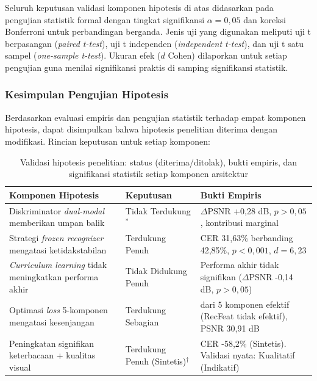 \documentclass[12pt,a4paper]{article}
\begin{document}
Seluruh keputusan validasi komponen hipotesis di atas didasarkan pada pengujian statistik formal dengan tingkat signifikansi $\alpha = 0,05$ dan koreksi Bonferroni untuk perbandingan berganda. Jenis uji yang digunakan meliputi uji t berpasangan (\textit{paired t-test}), uji t independen (\textit{independent t-test}), dan uji t satu sampel (\textit{one-sample t-test}). Ukuran efek ($d$ Cohen) dilaporkan untuk setiap pengujian guna menilai signifikansi praktis di samping signifikansi statistik.


\subsubsection{Kesimpulan Pengujian Hipotesis}
\label{subsubsec:kesimpulan-hipotesis}

Berdasarkan evaluasi empiris dan pengujian statistik terhadap empat komponen hipotesis, dapat disimpulkan bahwa hipotesis penelitian diterima dengan modifikasi. Rincian keputusan untuk setiap komponen:

\begin{table}[!htbp]
    \caption[Evaluasi hipotesis penelitian]{Validasi hipotesis penelitian: status (diterima/ditolak), bukti empiris, dan signifikansi statistik setiap komponen arsitektur}
    \label{tab:ringkasan-hipotesis}
    \begin{tabularx}{\textwidth}{|>{\raggedright\arraybackslash}X|>{\raggedright\arraybackslash}p{3cm}|>{\raggedright\arraybackslash}X|}
        \hline
        \textbf{Komponen Hipotesis}                                             & \textbf{Keputusan}                              & \textbf{Bukti Empiris}                                                     \\
        \hline
        Diskriminator \textit{dual-modal} memberikan umpan balik                & Tidak Terdukung$^*$                    & $\Delta$PSNR +0,28 dB, $p>0,05$, kontribusi marginal              \\
        \hline
        Strategi \textit{frozen recognizer} mengatasi ketidakstabilan  & Terdukung Penuh                        & CER 31,63\% berbanding 42,85\%, $p<0,001$, $d=6,23$                       \\
        \hline
        \textit{Curriculum learning} tidak meningkatkan performa akhir & Tidak Didukung Penuh                   & Performa akhir tidak signifikan ($\Delta$PSNR -0,14 dB, $p>0,05$) \\
        \hline
        Optimasi \textit{loss} 5-komponen mengatasi kesenjangan        & Terdukung Sebagian                     & 4 dari 5 komponen efektif (RecFeat tidak efektif), PSNR 30,91 dB  \\
        \hline
        Peningkatan signifikan keterbacaan + kualitas visual           & Terdukung Penuh (Sintetis)$^{\dagger}$ & CER -58,2\% (Sintetis). Validasi nyata: Kualitatif (Indikatif)    \\
        \hline
    \end{tabularx}
\end{table}
\end{document}
